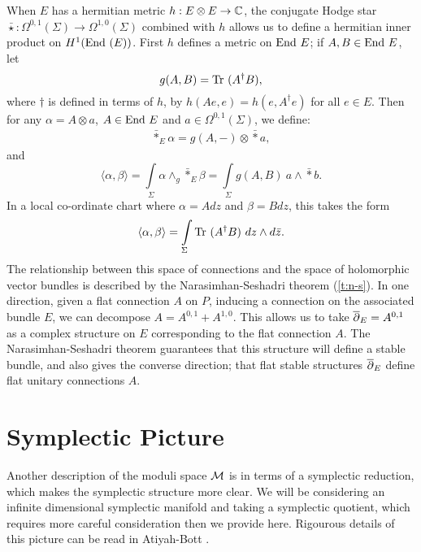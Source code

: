 	When $E$ has a hermitian metric $h:E\otimes E \to \mathbb{C}$, the conjugate Hodge star $\bar{\star}:\Omega^{0,1}(\Sigma) \to \Omega^{1,0}(\Sigma)$ combined with $h$ allows us to define a hermitian inner product on $H^1(\text{End } (E))$.  First $h$ defines a metric on $\text{End } E$; if $A,B\in \text{End } E$, let
	\begin{equation}
	g(A,B) = \text{Tr }(A^\dagger B),
	\end{equation}
	where $\dagger$ is defined in terms of $h$, by $h(Ae,e) = h(e,A^\dagger e)$ for all $e\in E$. Then for any $\alpha = A \otimes a$, $A\in \text{End } E$ and $a \in \Omega^{0,1}(\Sigma)$, we define:
	\begin{align}
	\bar{\ast}_E \alpha = g(A,-)\otimes \bar{\ast}a, 
	\end{align}
	and
	\begin{equation}
	\langle \alpha, \beta \rangle = \int\limits_\Sigma \alpha \wedge_g \bar{\ast}_E \beta =\int\limits_\Sigma g(A,B)~a\wedge \bar{\ast} b.
	\end{equation}
	In a local co-ordinate chart where $\alpha = Adz$ and $\beta = Bdz$, this takes the form
	\begin{equation}
	\langle \alpha, \beta \rangle = \int\limits_\Sigma \text{Tr }(A^\dagger B)~dz\wedge d\bar{z}.
	\end{equation}
	The relationship between this space of connections and the space of holomorphic vector bundles is described by the Narasimhan-Seshadri theorem (\ref{t:n-s}). In one direction, given a flat connection $A$ on $P$, inducing a connection on the associated bundle $E$, we can decompose $A = A^{0,1} + A^{1,0}$. This allows us to take $\overline{\partial}_E = A^{0,1}$ as a complex structure on $E$ corresponding to the flat connection $A$. The Narasimhan-Seshadri theorem guarantees that this structure will define a stable bundle, and also gives the converse direction; that flat stable structures $\overline{\partial}_E$ define flat unitary connections $A$. 

	\section{Symplectic Picture}
	\label{s:background-sym}
	Another description of the moduli space $\mathcal{M}$ is in terms of a symplectic reduction, which makes the symplectic structure more clear. We will be considering an infinite dimensional symplectic manifold and taking a symplectic quotient, which requires more careful consideration then we provide here. Rigourous details of this picture can be read in Atiyah-Bott \cite{atiyah_yang-mills_1983}.
	
